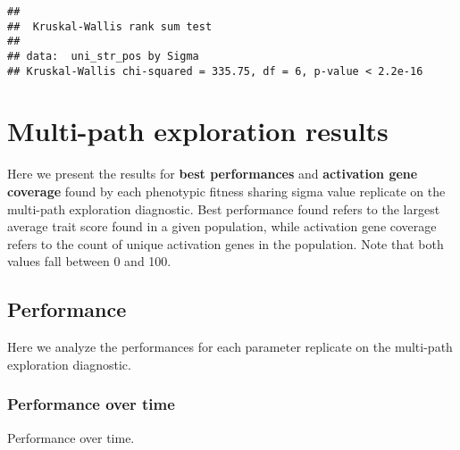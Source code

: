 \documentclass[]{book}
\newenvironment{Shaded}{\begin{snugshade}}{\end{snugshade}}
\newcommand{\DataTypeTok}[1]{\textcolor[rgb]{0.13,0.29,0.53}{#1}}
\newcommand{\KeywordTok}[1]{\textcolor[rgb]{0.13,0.29,0.53}{\textbf{#1}}}
\newcommand{\NormalTok}[1]{#1}
\newcommand{\OperatorTok}[1]{\textcolor[rgb]{0.81,0.36,0.00}{\textbf{#1}}}
\newcommand{\StringTok}[1]{\textcolor[rgb]{0.31,0.60,0.02}{#1}}
\begin{document}
\begin{verbatim}
## 
##  Kruskal-Wallis rank sum test
## 
## data:  uni_str_pos by Sigma
## Kruskal-Wallis chi-squared = 335.75, df = 6, p-value < 2.2e-16
\end{verbatim}

\hypertarget{multi-path-exploration-results-4}{%
\section{Multi-path exploration results}\label{multi-path-exploration-results-4}}

Here we present the results for \textbf{best performances} and \textbf{activation gene coverage} found by each phenotypic fitness sharing sigma value replicate on the multi-path exploration diagnostic.
Best performance found refers to the largest average trait score found in a given population, while activation gene coverage refers to the count of unique activation genes in the population.
Note that both values fall between 0 and 100.

\hypertarget{performance-4}{%
\subsection{Performance}\label{performance-4}}

Here we analyze the performances for each parameter replicate on the multi-path exploration diagnostic.

\hypertarget{performance-over-time-13}{%
\subsubsection{Performance over time}\label{performance-over-time-13}}

Performance over time.

\begin{Shaded}
\end{Shaded}
\end{document}
